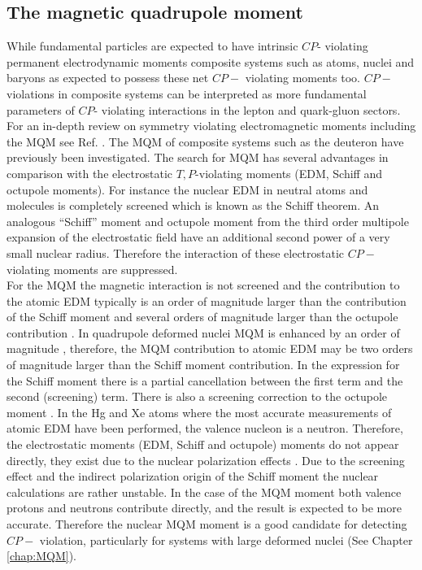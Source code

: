 \documentclass[10pt,a4paper, twoside, openright]{report}
\begin{document}
\subsection{The magnetic quadrupole moment}
While fundamental particles are expected to have intrinsic $CP$- violating permanent electrodynamic moments composite systems such as atoms, nuclei and baryons as expected to possess these net $CP-$ violating moments too. $CP-$ violations in composite systems can be interpreted as more fundamental parameters of $CP$- violating interactions in the lepton and quark-gluon sectors. For an in-depth review on symmetry violating electromagnetic moments including the MQM see Ref. \cite{GF2004, KhriplovichPNC, SFK1984, Roberts2015, KhriplovichCP, Pospelov2005}. The MQM of composite systems such as the deuteron \cite{Liu2012} have previously been investigated. The search for MQM has several advantages in comparison with the electrostatic $T,P$-violating moments (EDM, Schiff and octupole moments). For instance the nuclear EDM in neutral atoms and molecules is completely screened which is known as the Schiff theorem\cite{Schiff1963}. An analogous ``Schiff'' moment and octupole moment from the third order multipole expansion of the electrostatic field have an additional second power of a very small nuclear radius. Therefore the interaction of these electrostatic $CP-$ violating moments are suppressed. \\
\linebreak For the MQM the magnetic interaction is not screened and the contribution to the atomic EDM typically is an order of magnitude larger than the contribution of the Schiff moment and several orders of magnitude larger than the octupole contribution \cite{SFK1984, Flambaum1997}.  In quadrupole deformed nuclei MQM is enhanced by an order of magnitude \cite{Flambaum1994}, therefore, the MQM contribution to atomic EDM may be two orders of magnitude larger than the Schiff moment contribution. In the expression for the Schiff moment there is a partial cancellation between the first term and the second (screening) term. There is also a screening correction to the octupole moment \cite{ Flambaum1986, SFK1984, Flambaum2012}. In the Hg and Xe atoms  where the most accurate measurements of atomic EDM have been performed, the valence nucleon is a neutron. Therefore, the electrostatic moments (EDM, Schiff and octupole) moments do not appear directly, they exist due to the nuclear polarization effects \cite{Flambaum1986}. Due to the screening effect and the indirect polarization origin of the Schiff moment the nuclear calculations are rather unstable. In the case of the MQM moment both valence protons and neutrons  contribute directly, and the result is expected to be more accurate\cite{Flambaum2014}. Therefore the nuclear MQM moment is a good candidate for detecting $CP-$ violation, particularly for systems with large deformed nuclei (See Chapter \ref{chap:MQM}).\\
\end{document}
